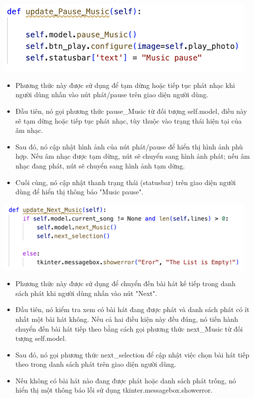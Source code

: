 \documentclass[a4paper]{article}
\begin{document}
\begin{center}
\includegraphics[width=130mm]{template_SGU 2/audio_updatePause.png}
\end{center}
\begin{itemize}
    \item Phương thức này được sử dụng để tạm dừng hoặc tiếp tục phát nhạc khi người dùng nhấn vào nút phát/pause trên giao diện người dùng.
    \item Đầu tiên, nó gọi phương thức pause\_Music từ đối tượng self.model, điều này sẽ tạm dừng hoặc tiếp tục phát nhạc, tùy thuộc vào trạng thái hiện tại của âm nhạc.
    \item Sau đó, nó cập nhật hình ảnh của nút phát/pause để hiển thị hình ảnh phù hợp. Nếu âm nhạc được tạm dừng, nút sẽ chuyển sang hình ảnh phát; nếu âm nhạc đang phát, nút sẽ chuyển sang hình ảnh tạm dừng.
    \item Cuối cùng, nó cập nhật thanh trạng thái (statusbar) trên giao diện người dùng để hiển thị thông báo "Music pause".
\end{itemize}

\begin{center}
\includegraphics[width=130mm]{template_SGU 2/audio_updateNext.png}
\end{center}
\begin{itemize}
    \item Phương thức này được sử dụng để chuyển đến bài hát kế tiếp trong danh sách phát khi người dùng nhấn vào nút "Next".
    \item Đầu tiên, nó kiểm tra xem có bài hát đang được phát và danh sách phát có ít nhất một bài hát không. Nếu cả hai điều kiện này đều đúng, nó tiến hành chuyển đến bài hát tiếp theo bằng cách gọi phương thức next\_Music từ đối tượng self.model.
    \item Sau đó, nó gọi phương thức next\_selection để cập nhật việc chọn bài hát tiếp theo trong danh sách phát trên giao diện người dùng.
    \item Nếu không có bài hát nào đang được phát hoặc danh sách phát trống, nó hiển thị một thông báo lỗi sử dụng tkinter.messagebox.showerror.
\end{itemize}
\end{document}
